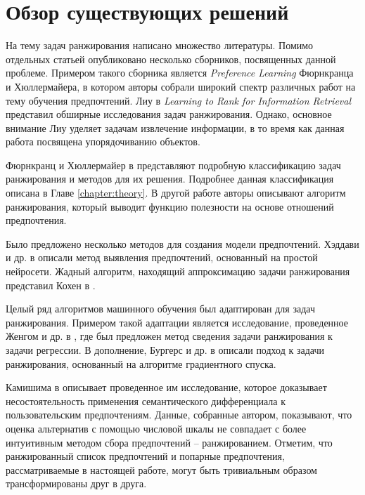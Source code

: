 \chapter{Обзор существующих решений}
\label{chapter:literature}

На тему задач ранжирования написано множество литературы. Помимо отдельных статьей опубликовано несколько сборников, посвященных данной проблеме. Примером такого сборника является \textit{Preference Learning} \cite{plbook:2010} Фюрнкранца и Хюллермайера, в котором авторы собрали широкий спектр различных работ на тему обучения предпочтений. Лиу в \textit{Learning to Rank for Information Retrieval} \cite{Liu:2011} представил обширные исследования задач ранжирования. Однако, основное внимание Лиу уделяет задачам извлечение информации, в то время как данная работа посвящена упорядочиванию объектов.

Фюрнкранц и Хюллермайер в \cite{plbook:Introduction:2010} представляют подробную классификацию задач ранжирования и методов для их решения. Подробнее данная классификация описана в Главе \ref{chapter:theory}. В другой работе \cite{Furnkranz:2003} авторы описывают алгоритм ранжирования, который выводит функцию полезности на основе отношений предпочтения.

Было предложено несколько методов для создания модели предпочтений. Хэддави и др. в \cite{Haddawy:2003} описали метод выявления предпочтений, основанный на простой нейросети. Жадный алгоритм, находящий аппроксимацию задачи ранжирования представил Кохен в \cite{Cohen:1999}.

Целый ряд алгоритмов машинного обучения был адаптирован для задач ранжирования. Примером такой адаптации является исследование, проведенное Женгом и др. в \cite{Zheng:2007}, где был предложен метод сведения задачи ранжирования к задачи регрессии. В дополнение, Бургерс и др. в \cite{Burges:2005} описали подход к задачи ранжирования, основанный на алгоритме градиентного спуска.

Камишима в \cite{Kamishima:2003} описывает проведенное им исследование, которое доказывает несостоятельность применения семантического дифференциала \cite{Osgood:1957} к пользовательским предпочтениям. Данные, собранные автором, показывают, что оценка альтернатив с помощью числовой шкалы не совпадает с более интуитивным методом сбора предпочтений – ранжированием. Отметим, что ранжированный список предпочтений и попарные предпочтения, рассматриваемые в настоящей работе, могут быть тривиальным образом трансформированы друг в друга.


